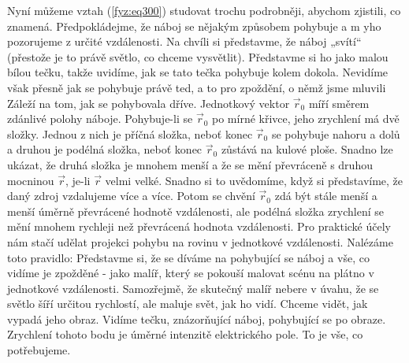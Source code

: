 {    Nyní můžeme vztah (\ref{fyz:eq300}) studovat trochu podrobněji, abychom zjistili, co znamená. 
    Předpokládejme, že náboj se nějakým způsobem pohybuje a m yho pozorujeme z určité vzdálenosti. 
    Na chvíli si představme, že náboj „svítí“ (přestože je to právě světlo, co chceme vysvětlit). 
    Představme si ho jako malou bílou tečku, takže uvidíme, jak se tato tečka pohybuje kolem 
    dokola. Nevidíme však přesně jak se pohybuje právě ted, a to pro zpoždění, o němž jsme mluvili 
    Záleží na tom, jak se pohybovala dříve. Jednotkový vektor \(\vec{r}_0\) míří směrem zdánlivé 
    polohy náboje. Pohybuje-li se \(\vec{r}_0\) po mírné křivce, jeho zrychlení má dvě složky. 
    Jednou z nich je příčná složka, neboť konec \(\vec{r}_0\) se pohybuje nahoru a dolů a druhou je 
    podélná složka, neboť konec \(\vec{r}_0\) zůstává na kulové ploše. Snadno lze ukázat, že druhá 
    složka je mnohem menší a že se mění převráceně s druhou mocninou \(\vec{r}\), je-li \(\vec{r}\) 
    velmi velké. Snadno si to uvědomíme, když si představíme, že daný zdroj vzdalujeme více a více. 
    Potom se chvění \(\vec{r}_0\) zdá být stále menší a menší úměrně převrácené hodnotě 
    vzdálenosti, ale podélná složka zrychlení se mění mnohem rychleji než převrácená hodnota 
    vzdálenosti. Pro praktické účely nám stačí udělat projekci pohybu na rovinu v jednotkové 
    vzdálenosti. Nalézáme toto pravidlo: Představme si, že se díváme na pohybující se náboj a vše, 
    co vidíme je zpožděné - jako malíř, který se pokouší malovat scénu na plátno v jednotkové 
    vzdálenosti. Samozřejmě, že skutečný malíř nebere v úvahu, že se světlo šíří určitou rychlostí, 
    ale maluje svět, jak ho vidí. Chceme vidět, jak vypadá jeho obraz. Vidíme tečku, znázorňující 
    náboj, pohybující se po obraze. Zrychlení tohoto bodu je úměrné intenzitě elektrického pole. To 
    je vše, co potřebujeme.
    
}
